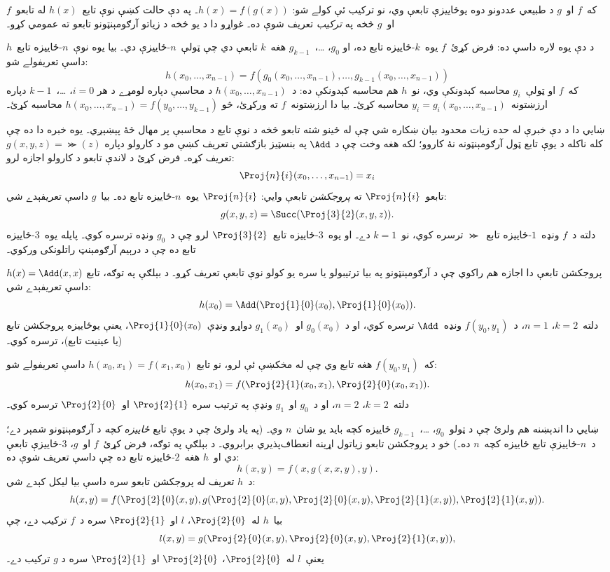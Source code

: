 \documentclass[../../../include/open-logic-section]{subfiles}
\begin{document}

که~$f$ او~$g$ د طبيعي عددونو دوه يوځاييزې تابعې وي، نو ترکيب ئې
کولے شو: $h(x) = f(g(x))$۔ په دې حالت کښې نوې تابع~$h(x)$ له
تابعو~$f$ او~$g$ څخه په \emph{ترکيب} تعريف شوې ده۔ غواړو دا د يو
څخه د زياتو آرګومېنټونو تابعو ته عمومي کړو۔

د دې يوه لاره داسې ده: فرض کړئ~$f$ يوه~$k$-ځاييزه تابع ده، او
$g_0$، \dots،~$g_{k-1}$ هغه~$k$ تابعې دي چې ټولې~$n$-ځاييزې دي۔
بيا يوه نوې~$n$-ځاييزه تابع~$h$ داسې تعريفولے شو:
\[
h(x_0, \dots, x_{n-1}) =
f(g_0(x_0, \dots, x_{n-1}), \dots, g_{k-1}(x_0, \dots, x_{n-1}))
\]
که~$f$ او ټولې~$g_i$ محاسبه کېدونکې وي، نو~$h$ هم محاسبه کېدونکې
ده: د~$h(x_0, \dots, x_{n-1})$ د محاسبې دپاره لومړے د هر
$i = 0$، \dots،~$k-1$ دپاره ارزښتونه~$y_i = g_i(x_0, \dots,
x_{n-1})$ محاسبه کړئ۔ بيا دا ارزښتونه~$f$ ته ورکړئ، څو
$h(x_0, \dots, x_{n-1}) = f(y_0, \dots, y_{k-1})$ محاسبه کړئ۔

ښايي دا د دې خبرې له حده زيات محدود بيان ښکاره شي چې له ځينو شته
تابعو څخه د نوې تابع د محاسبې پر مهال څۀ پېښېږي۔ يوه خبره دا ده چې
کله ناکله د يوې تابع ټول آرګومېنټونه نۀ کاروو؛ لکه هغه وخت چې د
$\Add$ په بنسټيز بازګشتي تعريف کښې مو د کارولو دپاره
$g(x, y, z) = \Succ(z)$ تعريف کړه۔ فرض کړئ د لاندې تابعو د کارولو
اجازه لرو:
\[
\Proj{n}{i}(x_0, \dots, x_{n-1}) = x_i
\]
تابعو~$\Proj{n}{i}$ ته \emph{پروجکشن} تابعې وايي:
$\Proj{n}{i}$ يوه~$n$-ځاييزه تابع ده۔ بيا~$g$ داسې تعريفېدے شي:
\[
g(x, y, z) = \Succ(\Proj{3}{2}(x, y, z)).
\]
دلته د~$f$ ونډه~$1$-ځاييزه تابع~$\Succ$ ترسره کوي، نو~$k=1$ دے۔ او
يوه~$3$-ځاييزه تابع~$\Proj{3}{2}$ لرو چې د~$g_0$ ونډه ترسره کوي۔
پايله يوه~$3$-ځاييزه تابع ده چې د درېيم آرګومېنټ راتلونکی ورکوي۔

پروجکشن تابعې دا اجازه هم راکوي چې د آرګومېنټونو په بيا ترتيبولو يا
سره يو کولو نوې تابعې تعريف کړو۔ د بېلګې په توګه، تابع
$h(x) = \Add(x, x)$ داسې تعريفېدے شي:
\[
h(x_0) = \Add(\Proj{1}{0}(x_0),\Proj{1}{0}(x_0)).
\]
دلته~$k=2$، $n=1$، د~$f(y_0,y_1)$ ونډه~$\Add$ ترسره کوي، او د
$g_0(x_0)$ او~$g_1(x_0)$ دواړو ونډې~$\Proj{1}{0}(x_0)$، يعنې
يوځاييزه پروجکشن تابع (يا عينيت تابع)، ترسره کوي۔

که~$f(y_0, y_1)$ هغه تابع وي چې له مخکښې ئې لرو، نو تابع
$h(x_0, x_1) = f(x_1, x_0)$ داسې تعريفولے شو:
\[
h(x_0, x_1) = f(\Proj{2}{1}(x_0, x_1),\Proj{2}{0}(x_0, x_1)).
\]
دلته~$k=2$، $n = 2$، او د~$g_0$ او~$g_1$ ونډې په ترتيب سره
$\Proj{2}{1}$ او~$\Proj{2}{0}$ ترسره کوي۔

ښايي دا اندېښنه هم ولرئ چې د ټولو~$g_0$، \dots،~$g_{k-1}$ ځاييزه
کچه بايد يو شان~$n$ وي۔ (په ياد ولرئ چې د يوې تابع
\emph{ځاييزه کچه} د آرګومېنټونو شمېر دے؛ د~$n$-ځاييزې تابع ځاييزه
کچه~$n$ ده۔) خو د پروجکشن تابعو زياتول اړينه انعطاف‌پذيري برابروي۔
د بېلګې په توګه، فرض کړئ~$f$ او~$g$، $3$-ځاييزې تابعې دي او~$h$
هغه~$2$-ځاييزه تابع ده چې داسې تعريف شوې ده:
\[
h(x,y) = f(x,g(x,x,y),y).
\]
د~$h$ تعريف له پروجکشن تابعو سره داسې بيا ليکل کېدے شي:
\[
h(x,y) = f(\Proj{2}{0}(x,y), g(\Proj{2}{0}(x,y), \Proj{2}{0}(x,y),
\Proj{2}{1}(x,y)), \Proj{2}{1}(x,y)).
\]
بيا~$h$ له~$\Proj{2}{0}$، $l$ او~$\Proj{2}{1}$ سره د~$f$ ترکيب
دے، چې
\[
l(x,y) = g(\Proj{2}{0}(x,y),\Proj{2}{0}(x,y),\Proj{2}{1}(x,y)),
\]
يعنې~$l$ له~$\Proj{2}{0}$، $\Proj{2}{0}$ او~$\Proj{2}{1}$ سره د
$g$ ترکيب دے۔
\end{document}
